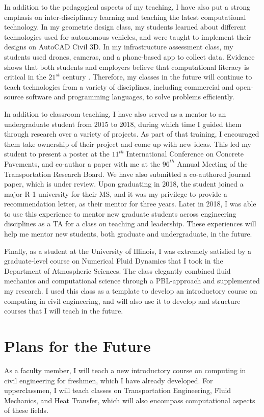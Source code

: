\documentclass[12pt]{article}
\begin{document}
In addition to the pedagogical aspects of my teaching, I have also put a strong emphasis on inter-disciplinary learning and teaching the latest computational technology. In my geometric design class, my students learned about different technologies used for autonomous vehicles, and were taught to implement their designs on AutoCAD Civil 3D. In my infrastructure assessment class, my students used drones, cameras, and a phone-based app to collect data. Evidence shows that both students and employers believe that computational literacy is critical in the $21^{st}$ century \cite{magana2012motivation}. Therefore, my classes in the future will continue to teach technologies from a variety of disciplines, including commercial and open-source software and programming languages, to solve problems efficiently. 

In addition to classroom teaching, I have also served as a mentor to an undergraduate student from 2015 to 2018, during which time I guided them through research over a variety of projects. As part of that training, I encouraged them take ownership of their project and come up with new ideas. This led my student to present a poster at the $11^{th}$ International Conference on Concrete Pavements, and co-author a paper with me at the $96^{th}$ Annual Meeting of the Transportation Research Board. We have also submitted a co-authored journal paper, which is under review. Upon graduating in 2018, the student joined a major R-1 university for their MS, and it was my privilege to provide a recommendation letter, as their mentor for three years. Later in 2018, I was able to use this experience to mentor new graduate students across engineering disciplines as a TA for a class on teaching and leadership. These experiences will help me mentor new students, both graduate and undergraduate, in the future.

Finally, as a student at the University of Illinois, I was extremely satisfied by a graduate-level course on Numerical Fluid Dynamics that I took in the Department of Atmospheric Sciences. The class elegantly combined fluid mechanics and computational science through a PBL-approach and supplemented my research. I used this class as a template to develop an introductory course on computing in civil engineering, and will also use it to develop and structure courses that I will teach in the future.  

\section*{Plans for the Future}
As a faculty member, I will teach a new introductory course on computing in civil engineering for freshmen, which I have already developed. For upperclassmen, I will teach classes on Transportation Engineering, Fluid Mechanics, and Heat Transfer, which will also encompass computational aspects of these fields. 
\end{document}
